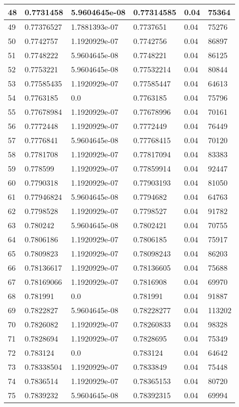 \begin{longtable}{|l|l|l|l|l|l|}
48 & 0.7731458 & 5.9604645e-08 & 0.77314585 & 0.04 & 75364 \\ \hline 
49 & 0.77376527 & 1.7881393e-07 & 0.7737651 & 0.04 & 75276 \\ \hline 
50 & 0.7742757 & 1.1920929e-07 & 0.7742756 & 0.04 & 86897 \\ \hline 
51 & 0.7748222 & 5.9604645e-08 & 0.7748221 & 0.04 & 86125 \\ \hline 
52 & 0.7753221 & 5.9604645e-08 & 0.77532214 & 0.04 & 80844 \\ \hline 
53 & 0.77585435 & 1.1920929e-07 & 0.77585447 & 0.04 & 64613 \\ \hline 
54 & 0.7763185 & 0.0 & 0.7763185 & 0.04 & 75796 \\ \hline 
55 & 0.77678984 & 1.1920929e-07 & 0.77678996 & 0.04 & 70161 \\ \hline 
56 & 0.7772448 & 1.1920929e-07 & 0.7772449 & 0.04 & 76449 \\ \hline 
57 & 0.7776841 & 5.9604645e-08 & 0.77768415 & 0.04 & 70120 \\ \hline 
58 & 0.7781708 & 1.1920929e-07 & 0.77817094 & 0.04 & 83383 \\ \hline 
59 & 0.778599 & 1.1920929e-07 & 0.77859914 & 0.04 & 92447 \\ \hline 
60 & 0.7790318 & 1.1920929e-07 & 0.77903193 & 0.04 & 81050 \\ \hline 
61 & 0.77946824 & 5.9604645e-08 & 0.7794682 & 0.04 & 64763 \\ \hline 
62 & 0.7798528 & 1.1920929e-07 & 0.7798527 & 0.04 & 91782 \\ \hline 
63 & 0.780242 & 5.9604645e-08 & 0.7802421 & 0.04 & 70755 \\ \hline 
64 & 0.7806186 & 1.1920929e-07 & 0.7806185 & 0.04 & 75917 \\ \hline 
65 & 0.7809823 & 1.1920929e-07 & 0.78098243 & 0.04 & 86203 \\ \hline 
66 & 0.78136617 & 1.1920929e-07 & 0.78136605 & 0.04 & 75688 \\ \hline 
67 & 0.78169066 & 1.1920929e-07 & 0.7816908 & 0.04 & 69970 \\ \hline 
68 & 0.781991 & 0.0 & 0.781991 & 0.04 & 91887 \\ \hline 
69 & 0.7822827 & 5.9604645e-08 & 0.78228277 & 0.04 & 113202 \\ \hline 
70 & 0.7826082 & 1.1920929e-07 & 0.78260833 & 0.04 & 98328 \\ \hline 
71 & 0.7828694 & 1.1920929e-07 & 0.7828695 & 0.04 & 75349 \\ \hline 
72 & 0.783124 & 0.0 & 0.783124 & 0.04 & 64642 \\ \hline 
73 & 0.78338504 & 1.1920929e-07 & 0.7833849 & 0.04 & 75448 \\ \hline 
74 & 0.7836514 & 1.1920929e-07 & 0.78365153 & 0.04 & 80720 \\ \hline 
75 & 0.7839232 & 5.9604645e-08 & 0.78392315 & 0.04 & 69994 \\ \hline 
\end{longtable}